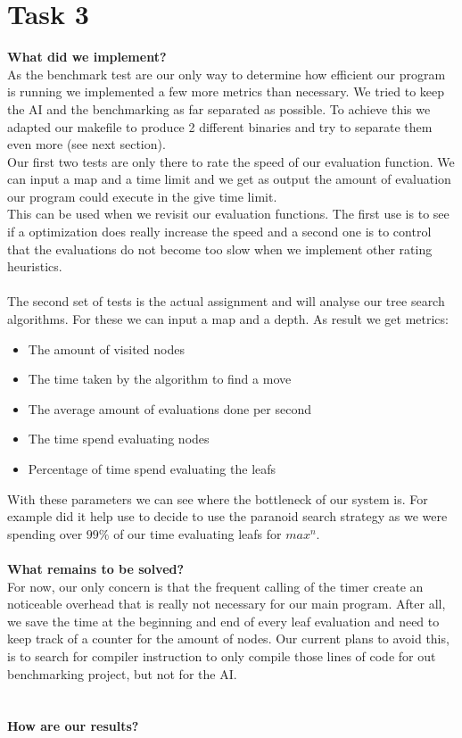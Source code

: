 \section{Task 3}

\textbf{What did we implement?}\\

As the benchmark test are our only way to determine how efficient our program is running we implemented a few more metrics than necessary. We tried to keep the AI and the benchmarking as far separated as possible. To achieve this we adapted our makefile to produce 2 different binaries and try to separate them even more (see next section).\\
Our first two tests are only there to rate the speed of our evaluation function. We can input a map and a time limit and we get as output the amount of evaluation our program could execute in the give time limit.\\
This can be used when we revisit our evaluation functions. The first use is to see if a optimization does really increase the speed and a second one is to control that the evaluations do not become too slow when we implement other rating heuristics. \\\\
The second set of tests is the actual assignment and will analyse our tree search algorithms. For these we can input a map and a depth. As result we get metrics:
\begin{itemize}
	\item The amount of visited nodes
	\item The time taken by the algorithm to find a move
	\item The average amount of evaluations done per second
	\item The time spend evaluating nodes
	\item Percentage of time spend evaluating the leafs 
\end{itemize}
With these parameters we can see where the bottleneck of our system is. For example did it help use to decide to use the paranoid search strategy as we were spending over $99\%$ of our time evaluating leafs for $max^{n}$.\\\\
\textbf{What remains to be solved?}\\

For now, our only concern is that the frequent calling of the timer create an noticeable overhead that is really not necessary for our main program. After all, we save the time at the beginning and end of every leaf evaluation and need to keep track of a counter for the amount of nodes. Our current plans to avoid this, is to search for compiler instruction to only compile those lines of code for out benchmarking project, but not for the AI.\\\\\\ 
\textbf{How are our results?}\\

